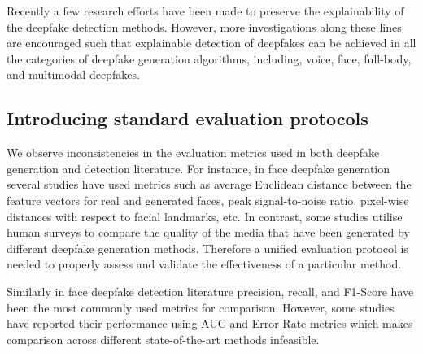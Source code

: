 Recently a few research efforts \cite{xu2022supervised, ishrak2022explainable, mathews2023explainable} have been made to preserve the explainability of the deepfake detection methods. However, more investigations along these lines are encouraged such that explainable detection of deepfakes can be achieved in all the categories of deepfake generation algorithms, including, voice, face, full-body, and multimodal deepfakes. 



\subsection{Introducing standard evaluation protocols} %

We observe inconsistencies in the evaluation metrics used in both deepfake generation and detection literature. For instance, in face deepfake generation several studies have used metrics such as average Euclidean distance between the feature vectors for real and generated faces, peak signal-to-noise ratio, pixel-wise distances with respect to facial landmarks, etc. In contrast, some studies \cite{wu2018reenactgan} utilise human surveys to compare the quality of the media that have been generated by different deepfake generation methods. Therefore a unified evaluation protocol is needed to properly assess and validate the effectiveness of a particular method. 

Similarly in face deepfake detection literature precision, recall, and F1-Score have been the most commonly used metrics for comparison. However, some studies have reported their performance using AUC and Error-Rate metrics which makes comparison across different state-of-the-art methods infeasible. 

